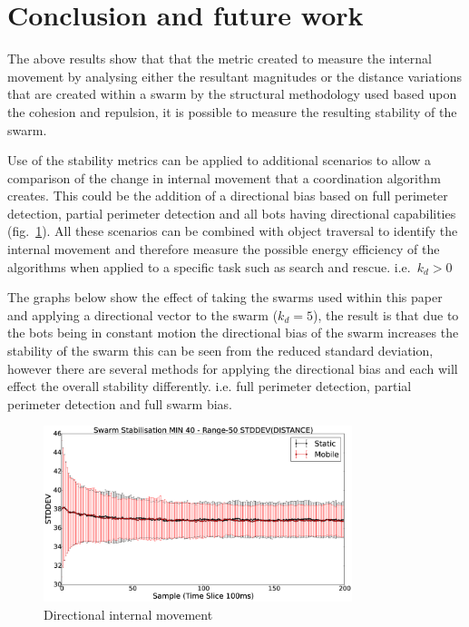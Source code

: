 \documentclass[10pt,journal,letterpaper,twoside]{IEEEtran}
\newcommand{\stability}{internal movement}
\newcommand{\Fig}{fig.}
\begin{document}
\section{Conclusion and future work\label{section:futureWork}}

The above results show that that the metric created to measure the \stability{} by analysing either the resultant magnitudes or the distance variations that are created within a swarm by the structural methodology used based upon the cohesion and repulsion, it is possible to measure the resulting stability of the swarm.

Use of the stability metrics can be applied to additional scenarios to allow a comparison of the change in \stability{} that a coordination algorithm creates. This could be the addition of a directional bias based on full perimeter detection, partial perimeter detection and all bots having directional capabilities (\Fig{}~\ref{methods:StabilityDistanceSwarmDirection}).
All these scenarios can be combined with object traversal to identify the \stability{} and therefore measure the possible energy efficiency of the algorithms when applied to a specific task such as search and rescue. i.e.~${k_d > 0}$

The graphs below show the effect of taking the swarms used within this paper and applying a directional vector to the swarm ($k_d = 5$), the result is that due to the bots being in constant motion the directional bias of the swarm increases the stability of the swarm this can be seen from the reduced standard deviation, however there are several methods for applying the directional bias and each will effect the overall stability differently. i.e. full perimeter detection, partial perimeter detection and full swarm bias.

\begin{figure}[H]
\begin{center}
\includegraphics[width=9cm]{figures/StabilityDistanceSwarmDirection}
\end{center}
\caption{Directional \stability{}\label{methods:StabilityDistanceSwarmDirection}}
\end{figure}
\end{document}
